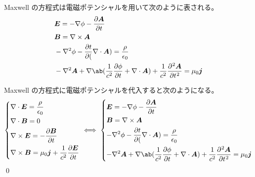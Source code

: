 \documentclass[uplatex,dvipdfmx,a4paper,11pt]{jlreq}
\makeatletter
\newcommand{\EE}{\bm{E}}
\newcommand{\BB}{\bm{B}}
\renewcommand{\AA}{\bm{A}}
\newcommand{\vnabla}{\mathbf{\nabla}}
\newcommand{\laplacian}{\nabla^2}
\theoremstyle{definition}
\renewenvironment{proof}[1][\proofname]{\par
  \normalfont
  \topsep6\p@\@plus6\p@ \trivlist
  \item[\hskip\labelsep{\bfseries #1}\@addpunct{\bfseries}]\ignorespaces\quad\par
}{%
  \qed\endtrivlist\@endpefalse
}
\renewcommand\proofname{証明}
\makeatother
\begin{document}
\begin{theorem}
  Maxwell の方程式は電磁ポテンシャルを用いて次のように表される。
  \begin{align}
     & \EE = - \vnabla\phi - \diffp{\AA}{t}                                                                                       \\
     & \BB = \vnabla\times\AA                                                                                                     \\
     & -\laplacian\phi - \diffp{t}(\vnabla\cdot\AA) = \frac{\rho}{\epsilon_0}                                                     \\
     & -\laplacian\AA + \vnabla\ab(\frac{1}{c^2}\diffp{\phi}{t} + \vnabla\cdot\AA) + \frac{1}{c^2}\diffp[2]{\AA}{t} = \mu_0\bm{j}
  \end{align}
\end{theorem}
\begin{proof}
  Maxwell の方程式に電磁ポテンシャルを代入すると次のようになる。
  \begin{align}
    \begin{dcases}
      \vnabla\cdot\EE  = \frac{\rho}{\epsilon_0} \\
      \vnabla\cdot\BB  = 0                       \\
      \vnabla\times\EE = -\diffp{\BB}{t}         \\
      \vnabla\times\BB = \mu_0\bm{j} + \frac{1}{c^2}\diffp{\EE}{t}
    \end{dcases}
    \iff
    \begin{dcases}
      \EE = - \vnabla\phi - \diffp{\AA}{t}                                   \\
      \BB = \vnabla\times\AA                                                 \\
      -\laplacian\phi - \diffp{t}(\vnabla\cdot\AA) = \frac{\rho}{\epsilon_0} \\
      -\laplacian\AA + \vnabla\ab(\frac{1}{c^2}\diffp{\phi}{t} + \vnabla\cdot\AA) + \frac{1}{c^2}\diffp[2]{\AA}{t} = \mu_0\bm{j}
    \end{dcases}
  \end{align}
\end{proof}
\end{document}
